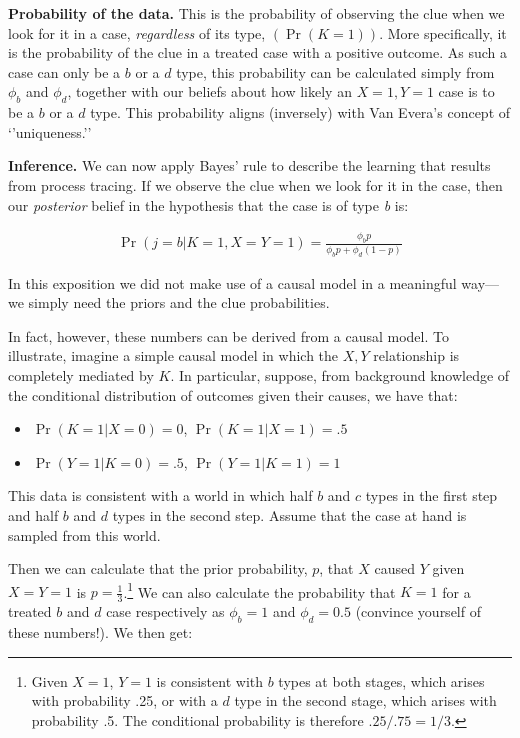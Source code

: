 \documentclass[
  12pt,
]{book}
\providecommand{\tightlist}{%
  \setlength{\itemsep}{0pt}\setlength{\parskip}{0pt}}
\begin{document}
\textbf{Probability of the data.} This is the probability of observing the clue when we look for it in a case, \emph{regardless} of its type, \((\Pr(K=1))\). More specifically, it is the probability of the clue in a treated case with a positive outcome. As such a case can only be a \(b\) or a \(d\) type, this probability can be calculated simply from \(\phi_b\) and \(\phi_d\), together with our beliefs about how likely an \(X=1, Y=1\) case is to be a \(b\) or a \(d\) type.
This probability aligns (inversely) with Van Evera's concept of `'uniqueness.''

\textbf{Inference.} We can now apply Bayes' rule to describe the learning that results from process tracing. If we observe the clue when we look for it in the case, then our \emph{posterior} belief in the hypothesis that the case is of type \emph{b} is:

\begin{eqnarray*}
\Pr(j = b |K=1, X=Y=1)=  \frac{\phi_b p }{\phi_b p+\phi_d (1-p)}
\end{eqnarray*}

In this exposition we did not make use of a causal model in a meaningful way---we simply need the priors and the clue probabilities.

In fact, however, these numbers can be derived from a causal model. To illustrate, imagine a simple causal model in which the \(X, Y\) relationship is completely mediated by \(K\). In particular, suppose, from background knowledge of the conditional distribution of outcomes given their causes, we have that:

\begin{itemize}
\tightlist
\item
  \(\Pr(K=1 | X=0) = 0\), \(\Pr(K=1 | X=1) = .5\)
\item
  \(\Pr(Y=1 | K=0) = .5\), \(\Pr(Y=1 | K=1) = 1\)
\end{itemize}

This data is consistent with a world in which half \(b\) and \(c\) types in the first step and half \(b\) and \(d\) types in the second step. Assume that the case at hand is sampled from this world.

Then we can calculate that the prior probability, \(p\), that \(X\) caused \(Y\) given \(X=Y=1\) is \(p = \frac13\).\footnote{Given \(X=1\), \(Y=1\) is consistent with \(b\) types at both stages, which arises with probability .25, or with a \(d\) type in the second stage, which arises with probability .5. The conditional probability is therefore \(.25/.75 = 1/3\).} We can also calculate the probability that \(K=1\) for a treated \(b\) and \(d\) case respectively as \(\phi_b=1\) and \(\phi_d=0.5\) (convince yourself of these numbers!). We then get:
\end{document}
